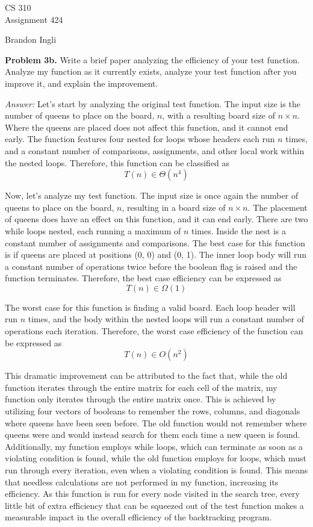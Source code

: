 \documentclass[11pt]{article}
\begin{document}
\thispagestyle{empty}

\begin{center}
{\large CS 310}\\
Assignment 424
\end{center}

\begin{flushright}
Brandon Ingli
\end{flushright}

\textbf{Problem 3b.} Write a brief paper analyzing the efficiency of your 
test function. Analyze my function as it currently exists, analyze your test 
function after you improve it, and explain the improvement. 

\textit{Answer:} Let's start by analyzing the original test function. The 
input size is the number of queens to place on the board, $n$, with a 
resulting board size of $n\times n$. Where the queens are placed does not 
affect this function, and it cannot end early. The function features four 
nested for loops whose headers each run $n$ times, and a constant number of 
comparisons, assignments, and other local work within the nested loops. 
Therefore, this function can be classified as
\[ 
  T(n) \in \Theta(n^4)
\]

Now, let's analyze my test function. The input size is once again the number 
of queens to place on the board, $n$, resulting in a board size of $n \times 
n$. The placement of queens does have an effect on this function, and it can 
end early. There are two while loops nested, each running a maximum of $n$ 
times. Inside the nest is a constant number of assignments and comparisons. 
The best case for this function is if queens are placed at positions 
(0, 0) and (0, 1). The inner loop body will run a constant number of 
operations twice before the boolean flag is raised and the function 
terminates. Therefore, the best case efficiency can be expressed as 
\[
  T(n) \in \Omega(1)
\]

The worst case for this function is finding a valid board. Each loop header 
will run $n$ times, and the body within the nested loops will run a constant 
number of operations each iteration. Therefore, the worst case efficiency of 
the function can be expressed as 
\[
  T(n) \in O(n^2)
\]

This dramatic improvement can be attributed to the fact that, while the old 
function iterates through the entire matrix for each cell of the matrix, my 
function only iterates through the entire matrix once. This is achieved by 
utilizing four vectors of booleans to remember the rows, columns, and 
diagonals where queens have been seen before. The old function would not 
remember where queens were and would instead search for them each time a 
new queen is found. Additionally, my function employs while loops, which can 
terminate as soon as a violating condition is found, while the old function 
employs for loops, which must run through every iteration, even when a 
violating condition is found. This means that needless calculations are 
not performed in my function, increasing its efficiency. As this function 
is run for every node visited in the search tree, every little bit of extra 
efficiency that can be squeezed out of the test function makes a measurable 
impact in the overall efficiency of the backtracking program.
\end{document}
